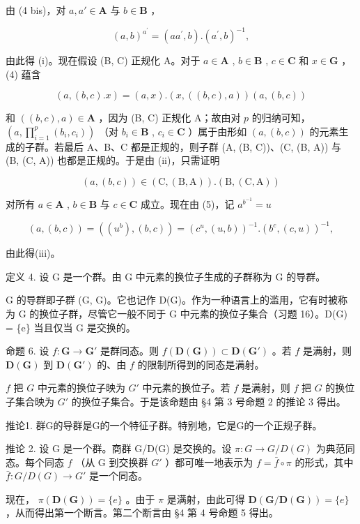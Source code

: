 由 (4 bis)，对 \(a, a' \in \mathbf{A}\) 与 \(b \in \mathbf{B}\) ，

\[
(a, b) ^ {a ^ {\prime}} = (a a ^ {\prime}, b). (a ^ {\prime}, b) ^ {- 1},
\]

由此得 (i)。现在假设 (B, C) 正规化 A。对于 \(a \in \mathbf{A}\) , \(b \in \mathbf{B}\) , \(c \in \mathbf{C}\) 和 \(x \in \mathbf{G}\) ，(4) 蕴含

\[
(a, (b, c). x) = (a, x). (x, ((b, c), a)) (a, (b, c))
\]

和 \(((b, c), a) \in \mathbf{A}\) ，因为 (B, C) 正规化 A；故由对 \(p\) 的归纳可知， \(\left(a, \prod_{i=1}^{p} (b_i, c_i)\right)\) （对 \(b_i \in \mathbf{B}\) , \(c_i \in \mathbf{C}\) ）属于由形如 \((a, (b, c))\) 的元素生成的子群。若最后 A、B、C 都是正规的，则子群 (A, (B, C))、(C, (B, A)) 与 (B, (C, A)) 也都是正规的。于是由 (ii)，只需证明

\[
(a, (b, c)) \in (\mathrm{C}, (\mathrm{B}, \mathrm{A})). (\mathrm{B}, (\mathrm{C}, \mathrm{A}))
\]

对所有 \(a \in \mathbf{A}\) , \(b \in \mathbf{B}\) 与 \(c \in \mathbf{C}\) 成立。现在由 (5)，记 \(a^{b^{-1}} = u\)

\[
(a, (b, c)) = ((u ^ {b}), (b, c)) = (c ^ {u}, (u, b)) ^ {- 1}. (b ^ {c}, (c, u)) ^ {- 1},
\]

由此得(iii)。

定义 4. 设 G 是一个群。由 G 中元素的换位子生成的子群称为 G 的导群。

G 的导群即子群 (G, G)。它也记作 D(G)。作为一种语言上的滥用，它有时被称为 G 的换位子群，尽管它一般不同于 G 中元素的换位子集合（习题 16）。D(G) = \{e\} 当且仅当 G 是交换的。

命题 6. 设 \(f: \mathbf{G} \to \mathbf{G}'\) 是群同态。则 \(f(\mathbf{D}(\mathbf{G})) \subset \mathbf{D}(\mathbf{G}')\) 。若 \(f\) 是满射，则 \(\mathbf{D}(\mathbf{G})\) 到 \(\mathbf{D}(\mathbf{G}')\) 的、由 \(f\) 的限制所得到的同态是满射。

\(f\) 把 \(G\) 中元素的换位子映为 \(G'\) 中元素的换位子。若 \(f\) 是满射，则 \(f\) 把 \(G\) 的换位子集合映为 \(G'\) 的换位子集合。于是该命题由 §4 第 3 号命题 2 的推论 3 得出。

推论1. 群G的导群是G的一个特征子群。特别地，它是G的一个正规子群。

推论 2. 设 G 是一个群。商群 G/D(G) 是交换的。设 \(\pi: G \to G/D(G)\) 为典范同态。每个同态 \(f\) （从 G 到交换群 \(G'\) ）都可唯一地表示为 \(f = \bar{f} \circ \pi\) 的形式，其中 \(\bar{f}: G/D(G) \to G'\) 是一个同态。

现在， \(\pi (\mathbf{D}(\mathbf{G})) = \{e\}\) 。由于 \(\pi\) 是满射，由此可得 \(\mathbf{D}(\mathbf{G} / \mathbf{D}(\mathbf{G})) = \{e\}\) ，从而得出第一个断言。第二个断言由 §4 第 4 号命题 5 得出。

